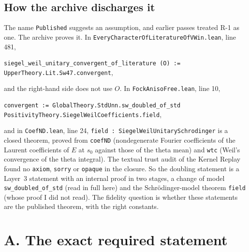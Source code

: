 \documentclass[11pt]{article}
\newcommand{\lean}[1]{\nolinkurl{#1}}
\theoremstyle{definition}
\begin{document}
\subsection{How the archive discharges it}

The name \lean{Published} suggests an assumption, and earlier passes treated R-1 as one. The archive proves it. In \lean{EveryCharacterOfLiteratureOfVWin.lean}, line 481,
\begin{center}
\lean{siegel_weil_unitary_convergent_of_literature (O) := UpperTheory.Lit.Sw47.convergent},
\end{center}
and the right-hand side does not use $O$. In \lean{FockAnisoFree.lean}, line 10,
\begin{center}
\lean{convergent := GlobalTheory.StdUnn.sw_doubled_of_std PositivityTheory.SiegelWeilCoefficients.field},
\end{center}
and in \lean{CoefND.lean}, line 24, \lean{field : SiegelWeilUnitarySchrodinger} is a closed theorem, proved from \lean{coefND} (nondegenerate Fourier coefficients of the Laurent coefficients of $E$ at $s_0$ against those of the theta mean) and \lean{wtc} (Weil's convergence of the theta integral). The textual trust audit of the Kernel Replay found no \lean{axiom}, \lean{sorry} or \lean{opaque} in the closure. So the doubling statement is a Layer~3 statement with an internal proof in two stages, a change of model \lean{sw_doubled_of_std} (read in full here) and the Schr\"odinger-model theorem \lean{field} (whose proof I did not read). The fidelity question is whether these statements are the published theorem, with the right constants.

\section{A. The exact required statement}\label{sec:statement}
\end{document}
